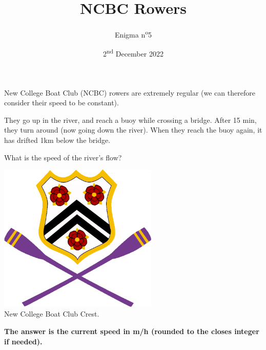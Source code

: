 \documentclass[a4paper, top=10mm]{article}
\title{\textbf{\huge{NCBC Rowers}}}
\author{Enigma n\textsuperscript{o}5}
\date{2\textsuperscript{nd} December 2022}
\begin{document}
	\maketitle
	
	New College Boat Club (NCBC) rowers are extremely regular (we can therefore consider their speed to be constant).
	
	They go up in the river, and reach a buoy while crossing a bridge.
	After 15 min, they turn around (now going down the river).
	When they reach the buoy again, it has drifted 1km below the bridge.
	
	What is the speed of the river's flow?
	
	\vspace{1cm}
	
	\begin{center}
		\includegraphics[height=200pt]{05NCBC_crest.png}\\
		New College Boat Club Crest.
	\end{center}
	
	\vspace{3cm}
	
	\textbf{The answer is the current speed in m/h (rounded to the closes integer if needed).}
	
\end{document}
